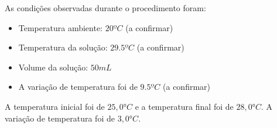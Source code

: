         \indent As condições observadas durante o procedimento foram:
        \begin{itemize}
            \item Temperatura ambiente: $20ºC$ (a confirmar)
            \item Temperatura da solução: $29.5ºC$ (a confirmar)
            \item Volume da solução: $50 mL$
            \item A variação de temperatura foi de $9.5ºC$ (a confirmar)
        \end{itemize}
         A temperatura inicial foi de $25,0°C$ e a temperatura final foi de $28,0°C$. A variação de temperatura foi de $3,0°C$.\\
